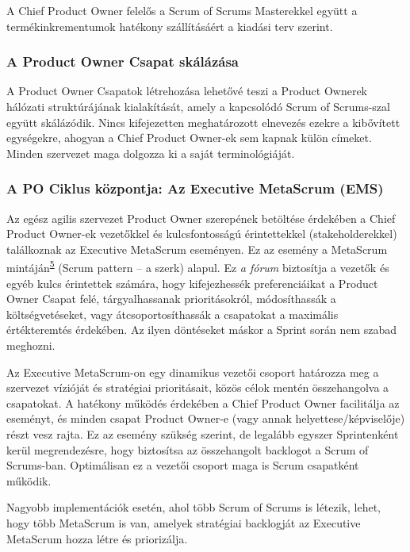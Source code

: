 \documentclass[12pt,a4paper,parskip=full]{scrartcl}
\begin{document}
A Chief Product Owner felelős a Scrum of Scrums Masterekkel együtt a termékinkrementumok hatékony szállításáért a kiadási terv szerint.

\subsubsection{A Product Owner Csapat skálázása}\label{scaling-the-product-owner-team}

A Product Owner Csapatok létrehozása lehetővé teszi a Product Ownerek hálózati struktúrájának kialakítását, amely a kapcsolódó Scrum of Scrums-szal együtt skálázódik. Nincs kifejezetten meghatározott elnevezés ezekre a kibővített egységekre, ahogyan a Chief Product Owner-ek sem kapnak külön címeket. Minden szervezet maga dolgozza ki a saját terminológiáját.

\subsubsection{A PO Ciklus központja: Az Executive MetaScrum (EMS)}\label{the-hub-of-the-po-cycle}

Az egész agilis szervezet Product Owner szerepének betöltése érdekében a Chief Product Owner-ek vezetőkkel és kulcsfontosságú érintettekkel (stakeholderekkel) találkoznak az Executive MetaScrum eseményen. Ez az esemény a MetaScrum mintáján\textsuperscript{\hyperref[citation5]{5}} (Scrum pattern – a szerk) alapul. Ez \emph{a fórum} biztosítja a vezetők és egyéb kulcs érintettek számára, hogy kifejezhessék preferenciáikat a Product Owner Csapat felé, tárgyalhassanak prioritásokról, módosíthassák a költségvetéseket, vagy átcsoportosíthassák a csapatokat a maximális értékteremtés érdekében. Az ilyen döntéseket máskor a Sprint során nem szabad meghozni.

Az Executive MetaScrum-on egy dinamikus vezetői csoport határozza meg a szervezet vízióját és stratégiai prioritásait, közös célok mentén összehangolva a csapatokat. A hatékony működés érdekében a Chief Product Owner facilitálja az eseményt, és minden csapat Product Owner-e (vagy annak helyettese/képviselője) részt vesz rajta. Ez az esemény szükség szerint, de legalább egyszer Sprintenként kerül megrendezésre, hogy biztosítsa az összehangolt backlogot a Scrum of Scrums-ban. Optimálisan ez a vezetői csoport maga is Scrum csapatként működik.

Nagyobb implementációk esetén, ahol több Scrum of Scrums is létezik, lehet, hogy több MetaScrum is van, amelyek stratégiai backlogját az Executive MetaScrum hozza létre és priorizálja.
\end{document}
